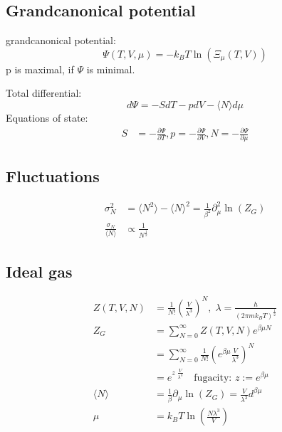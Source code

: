 \subsection*{Grandcanonical potential}
grandcanonical potential:
\begin{equation*}
    \Psi(T,V,\mu) = -k_B T \ln \left( \Xi_\mu (T,V)\right)
\end{equation*}
p is maximal, if $\Psi$ is minimal. 

Total differential:
\begin{equation*}
        d\Psi = -SdT -pdV - \langle N \rangle d\mu
\end{equation*}
Equations of state:
\begin{equation*}
    \begin{aligned}
        S &= - \frac{\partial \Psi}{\partial T} , p = - \frac{\partial \Psi}{\partial V}, N = - \frac{\partial \Psi}{\partial \mu}
    \end{aligned}
\end{equation*}

\subsection*{Fluctuations}
\begin{equation*}
    \begin{aligned}
        \sigma_N^2 &= \langle N^2 \rangle - \langle N \rangle^2 = \frac{1}{\beta^2} \partial_\mu^2 \ln(Z_G) \\
        \frac{\sigma_N}{\langle N \rangle} & \propto \frac{1}{N^{\frac{1}{2}}}
    \end{aligned}
\end{equation*}

\subsection*{Ideal gas}

\begin{equation*}
    \begin{aligned}
        Z(T,V,N) &= \frac{1}{N!} \left(\frac{V}{\lambda^3}\right)^N , \; \lambda = \frac{h}{(2 \pi m k_B T)^\frac{1}{2}} \\
        Z_G &= \sum_{N=0}^\infty Z(T,V,N)e^{\beta \mu N} \\
            &= \sum_{N=0}^\infty \frac{1}{N!}\left(e^{\beta \mu} \frac{V}{\lambda^3}\right)^N \\
            &= e^{z \; \frac{V}{\lambda^3}} \quad \text{fugacity: } z:= e^{\beta \mu} \\
        \langle N \rangle &= \frac{1}{\beta} \partial_\mu \ln (Z_G) = \frac{V}{\lambda^3} d^{\beta \mu} \\
        \mu &= k_B T \ln \left(\frac{N \lambda^3}{V}\right)
    \end{aligned}
\end{equation*}

